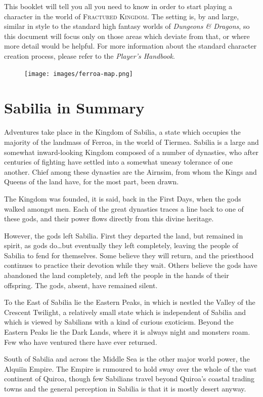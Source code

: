 \documentclass[10pt,twoside,openright,a4paper,twocolumn]{book}
\begin{document}
This booklet will tell you all you need to know in order to start playing a
character in the world of \textsc{Fractured Kingdom}.  The setting is, by and
large, similar in style to the standard high fantasy worlds of \textit{Dungeons
\& Dragons}, so this document will focus only on those areas which deviate from
that, or where more detail would be helpful.  For more information about the
standard character creation process, please refer to the \textit{Player's
Handbook}.

\begin{figure}[ht]
  \texttt{[image: images/ferroa-map.png]}
\end{figure}

\section{Sabilia in Summary}

Adventures take place in the Kingdom of Sabilia, a state which occupies the
majority of the landmass of Ferroa, in the world of Tiermea.  Sabilia is a
large and somewhat inward-looking Kingdom composed of a number of dynasties,
who after centuries of fighting have settled into a somewhat uneasy tolerance
of one another.  Chief among these dynasties are the Airnsim, from whom the
Kings and Queens of the land have, for the most part, been drawn.

The Kingdom was founded, it is said, back in the First Days, when the gods
walked amongst men.  Each of the great dynasties traces a line back to one
of these gods, and their power flows directly from this divine heritage.

However, the gods left Sabilia.  First they departed the land, but remained in
spirit, as gods do\dots but eventually they left completely, leaving the people
of Sabilia to fend for themselves.  Some believe they will return, and the
priesthood continues to practice their devotion while they wait.  Others
believe the gods have abandoned the land completely, and left the people in the
hands of their offspring.  The gods, absent, have remained silent.

To the East of Sabilia lie the Eastern Peaks, in which is nestled the Valley of
the Crescent Twilight, a relatively small state which is independent of Sabilia
and which is viewed by Sabilians with a kind of curious exoticism.  Beyond the
Eastern Peaks lie the Dark Lands, where it is always night and monsters roam.
Few who have ventured there have ever returned.

South of Sabilia and across the Middle Sea is the other major world power, the
Alqui{\"i}n Empire.  The Empire is rumoured to hold sway over the whole of the
vast continent of Quiroa, though few Sabilians travel beyond Quiroa's coastal
trading towns and the general perception in Sabilia is that it is mostly desert
anyway.
\end{document}
